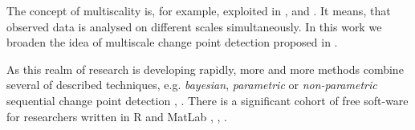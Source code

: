 The concept of multiscality is, for example, exploited in \citet{multiscaleCP1}, \citet{SpokoinyCP} and \citet{MultiscaleCP2}. It means, that observed data is analysed on different scales simultaneously. In this work we broaden the idea of multiscale change point detection proposed in \citet{SpokoinyCP}.

As this realm of research is developing rapidly, more and more methods combine several of described techniques, e.g.  \textit{bayesian},  \textit{parametric} or \textit{non-parametric}  sequential change point detection \citet{BayesOnlineWeb}, \citet{RossCP}. There is a significant cohort of free soft-ware for researchers written in R and MatLab \citet{CPRepR}, \citet{BayesOnlineWeb}, \citet{GausMixtWeb}.

